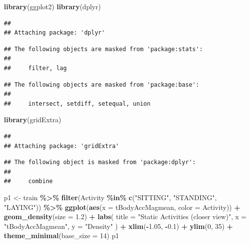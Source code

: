 \documentclass[
]{article}
\newenvironment{Shaded}{\begin{snugshade}}{\end{snugshade}}
\newcommand{\AttributeTok}[1]{\textcolor[rgb]{0.13,0.29,0.53}{#1}}
\newcommand{\DecValTok}[1]{\textcolor[rgb]{0.00,0.00,0.81}{#1}}
\newcommand{\FloatTok}[1]{\textcolor[rgb]{0.00,0.00,0.81}{#1}}
\newcommand{\FunctionTok}[1]{\textcolor[rgb]{0.13,0.29,0.53}{\textbf{#1}}}
\newcommand{\NormalTok}[1]{#1}
\newcommand{\OtherTok}[1]{\textcolor[rgb]{0.56,0.35,0.01}{#1}}
\newcommand{\SpecialCharTok}[1]{\textcolor[rgb]{0.81,0.36,0.00}{\textbf{#1}}}
\newcommand{\StringTok}[1]{\textcolor[rgb]{0.31,0.60,0.02}{#1}}
\begin{document}
\begin{Shaded}
\begin{Highlighting}[]
\FunctionTok{library}\NormalTok{(ggplot2)}
\FunctionTok{library}\NormalTok{(dplyr)}
\end{Highlighting}
\end{Shaded}

\begin{verbatim}
## 
## Attaching package: 'dplyr'
\end{verbatim}

\begin{verbatim}
## The following objects are masked from 'package:stats':
## 
##     filter, lag
\end{verbatim}

\begin{verbatim}
## The following objects are masked from 'package:base':
## 
##     intersect, setdiff, setequal, union
\end{verbatim}

\begin{Shaded}
\begin{Highlighting}[]
\FunctionTok{library}\NormalTok{(gridExtra)}
\end{Highlighting}
\end{Shaded}

\begin{verbatim}
## 
## Attaching package: 'gridExtra'
\end{verbatim}

\begin{verbatim}
## The following object is masked from 'package:dplyr':
## 
##     combine
\end{verbatim}

\begin{Shaded}
\begin{Highlighting}[]
\NormalTok{p1 }\OtherTok{\textless{}{-}}\NormalTok{ train }\SpecialCharTok{\%\textgreater{}\%}
  \FunctionTok{filter}\NormalTok{(Activity }\SpecialCharTok{\%in\%} \FunctionTok{c}\NormalTok{(}\StringTok{"SITTING"}\NormalTok{, }\StringTok{"STANDING"}\NormalTok{, }\StringTok{"LAYING"}\NormalTok{)) }\SpecialCharTok{\%\textgreater{}\%}
  \FunctionTok{ggplot}\NormalTok{(}\FunctionTok{aes}\NormalTok{(}\AttributeTok{x =}\NormalTok{ tBodyAccMagmean, }\AttributeTok{color =}\NormalTok{ Activity)) }\SpecialCharTok{+}
  \FunctionTok{geom\_density}\NormalTok{(}\AttributeTok{size =} \FloatTok{1.2}\NormalTok{) }\SpecialCharTok{+}
  \FunctionTok{labs}\NormalTok{(}
    \AttributeTok{title =} \StringTok{"Static Activities (closer view)"}\NormalTok{,}
    \AttributeTok{x =} \StringTok{"tBodyAccMagmean"}\NormalTok{,}
    \AttributeTok{y =} \StringTok{"Density"}
\NormalTok{  ) }\SpecialCharTok{+}
  \FunctionTok{xlim}\NormalTok{(}\SpecialCharTok{{-}}\FloatTok{1.05}\NormalTok{, }\SpecialCharTok{{-}}\FloatTok{0.1}\NormalTok{) }\SpecialCharTok{+}
  \FunctionTok{ylim}\NormalTok{(}\DecValTok{0}\NormalTok{, }\DecValTok{35}\NormalTok{) }\SpecialCharTok{+}
  \FunctionTok{theme\_minimal}\NormalTok{(}\AttributeTok{base\_size =} \DecValTok{14}\NormalTok{)}
\NormalTok{p1}
\end{Highlighting}
\end{Shaded}
\end{document}
